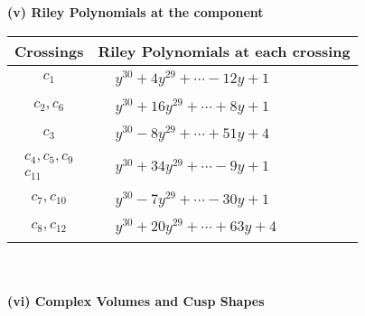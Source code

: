 \documentclass[1p]{elsarticle_modified}
\theoremstyle{definition}
\begin{document}
\newpage\renewcommand{\arraystretch}{1}
\flushleft \textbf{(v) Riley Polynomials at the component}\newline \\
\begin{tabular}{m{50pt}|m{274pt}}
Crossings & \hspace{64pt}Riley Polynomials at each crossing \\
\hline $$\begin{aligned}c_{1}\end{aligned}$$&$\begin{aligned}
&y^{30}+4 y^{29}+\cdots-12 y+1
\end{aligned}$\\
\hline $$\begin{aligned}c_{2},c_{6}\end{aligned}$$&$\begin{aligned}
&y^{30}+16 y^{29}+\cdots+8 y+1
\end{aligned}$\\
\hline $$\begin{aligned}c_{3}\end{aligned}$$&$\begin{aligned}
&y^{30}-8 y^{29}+\cdots+51 y+4
\end{aligned}$\\
\hline $$\begin{aligned}c_{4},c_{5},c_{9}\\c_{11}\end{aligned}$$&$\begin{aligned}
&y^{30}+34 y^{29}+\cdots-9 y+1
\end{aligned}$\\
\hline $$\begin{aligned}c_{7},c_{10}\end{aligned}$$&$\begin{aligned}
&y^{30}-7 y^{29}+\cdots-30 y+1
\end{aligned}$\\
\hline $$\begin{aligned}c_{8},c_{12}\end{aligned}$$&$\begin{aligned}
&y^{30}+20 y^{29}+\cdots+63 y+4
\end{aligned}$\\
\hline
\end{tabular}\\~\\
\newpage\flushleft \textbf{(vi) Complex Volumes and Cusp Shapes}
\end{document}
